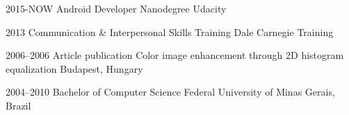 \documentclass[]{friggeri-cv}
\begin{document}
\begin{entrylist}
\entry
{2015-NOW}
{Android {\normalfont Developer Nanodegree}}
{Udacity}


\entry
{2013}
{Communication \& Interpersonal {\normalfont Skills Training}}
{Dale Carnegie Training}


\entry
{2006--2006}
{Article publication {\normalfont Color image enhancement through 2D histogram equalization}}
{Budapest, Hungary}


\entry
{2004--2010}
{{\normalfont Bachelor of} Computer Science}
{Federal University of Minas Gerais, Brazil}

\end{entrylist}




%
%
%
%
%
%
%
%
%
%
%
%
%
%
%
%
\end{document}
